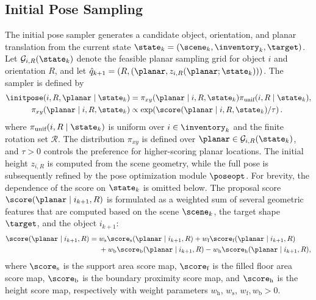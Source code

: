 \subsection{Initial Pose Sampling}
The initial pose sampler generates a candidate object, orientation, and planar
translation from the current state $\state_k=(\scene_k,\inventory_k,\target)$.
Let $\mathcal{G}_{i,R}(\state_k)$ denote the feasible planar sampling grid for
object $i$ and orientation $R$, and let
$\hat{q}_{k+1}=(R,(\planar,z_{i,R}(\planar;\state_k)))$.
The sampler is defined by
\begin{equation*}
    \begin{aligned}
        \initpose(i,R,\planar\mid\state_k)
        &= \pi_{xy}(\planar\mid i,R,\state_k)
           \pi_\text{unif}(i,R\mid\state_k),\\
        \pi_{xy}(\planar\mid i,R,\state_k)
        &\propto
        \exp\!\left(\score(\planar\mid i,R,\state_k)/\tau\right).
    \end{aligned}
\end{equation*}
where $\pi_\text{unif}(i,R\mid\state_k)$ is uniform over
$i\in\inventory_k$ and the finite rotation set $\mathcal{R}$.
The distribution $\pi_{xy}$ is defined over
$\planar\in\mathcal{G}_{i,R}(\state_k)$, and $\tau>0$ controls the preference
for higher-scoring planar locations. The initial height $z_{i,R}$ is computed
from the scene geometry, while the full pose is subsequently refined by the
pose optimization module $\poseopt$.
For brevity, the dependence of the score on $\state_k$ is omitted below.
The proposal score $\score(\planar\mid i_{k+1},R)$ is formulated as a weighted sum of several geometric features that are computed based on the scene $\scene_k$, the target shape $\target$, and the object $i_{k+1}$:
\begin{equation*}
  \begin{split}
    \score(\planar\mid i_{k+1},R) ={}& w_\text{s}\score_\text{s}(\planar\mid i_{k+1},R)+w_\text{f}\score_\text{f}(\planar\mid i_{k+1},R) \\
    &+w_\text{b}\score_\text{b}(\planar\mid i_{k+1},R)-w_\text{h}\score_\text{h}(\planar\mid i_{k+1},R),
  \end{split}
\end{equation*}
where $\score_\text{s}$ is the support area score map, $\score_\text{f}$ is the filled floor area score map, $\score_\text{b}$ is the boundary proximity score map, and $\score_\text{h}$ is the height score map, respectively with weight parameters $w_\text{h}$, $w_\text{s}$, $w_\text{f}, w_\text{b} > 0$.

